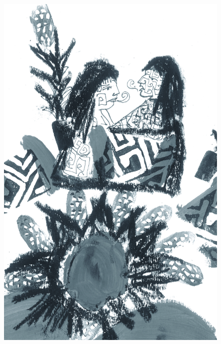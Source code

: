\pagebreak
\thispagestyle{empty}
\begin{figure}
\vspace*{-2cm}
\hspace*{-2.2cm}\includegraphics[width=138mm]{./imgs/img5.jpg}
\end{figure}

\chapter*{}


